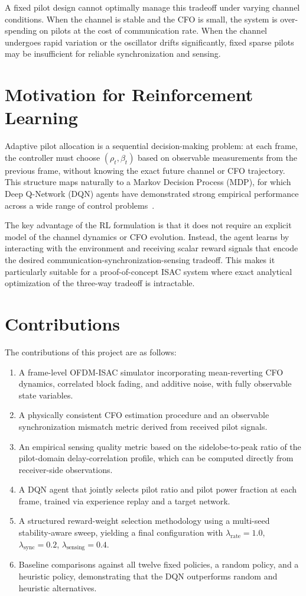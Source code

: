 A fixed pilot design cannot optimally manage this tradeoff under varying channel conditions. When the channel is stable and the CFO is small, the system is over-spending on pilots at the cost of communication rate. When the channel undergoes rapid variation or the oscillator drifts significantly, fixed sparse pilots may be insufficient for reliable synchronization and sensing.

\section{Motivation for Reinforcement Learning}

Adaptive pilot allocation is a sequential decision-making problem: at each frame, the controller must choose $(\rho_t, \beta_t)$ based on observable measurements from the previous frame, without knowing the exact future channel or CFO trajectory. This structure maps naturally to a Markov Decision Process (MDP), for which Deep Q-Network (DQN) agents have demonstrated strong empirical performance across a wide range of control problems~\cite{mnih2015human}.

The key advantage of the RL formulation is that it does not require an explicit model of the channel dynamics or CFO evolution. Instead, the agent learns by interacting with the environment and receiving scalar reward signals that encode the desired communication-synchronization-sensing tradeoff. This makes it particularly suitable for a proof-of-concept ISAC system where exact analytical optimization of the three-way tradeoff is intractable.

\section{Contributions}

The contributions of this project are as follows:
\begin{enumerate}
    \item A frame-level OFDM-ISAC simulator incorporating mean-reverting CFO dynamics, correlated block fading, and additive noise, with fully observable state variables.
    \item A physically consistent CFO estimation procedure and an observable synchronization mismatch metric derived from received pilot signals.
    \item An empirical sensing quality metric based on the sidelobe-to-peak ratio of the pilot-domain delay-correlation profile, which can be computed directly from receiver-side observations.
    \item A DQN agent that jointly selects pilot ratio and pilot power fraction at each frame, trained via experience replay and a target network.
    \item A structured reward-weight selection methodology using a multi-seed stability-aware sweep, yielding a final configuration with $\lambda_{\text{rate}} = 1.0$, $\lambda_{\text{sync}} = 0.2$, $\lambda_{\text{sensing}} = 0.4$.
    \item Baseline comparisons against all twelve fixed policies, a random policy, and a heuristic policy, demonstrating that the DQN outperforms random and heuristic alternatives.
\end{enumerate}

